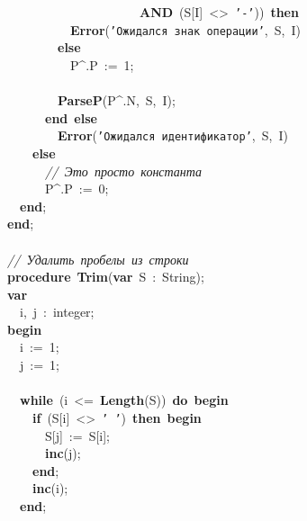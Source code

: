 \mbox{}\ \ \ \ \ \ \ \ \ \ \ \ \ \ \ \ \ \ \ \ \ \textbf{AND}\ (S[I]\ \textless{}\textgreater{}\ \texttt{'-'}))\ \textbf{then} \\
\mbox{}\ \ \ \ \ \ \ \ \ \ \textbf{Error}(\texttt{'Ожидался\ знак\ операции'},\ S,\ I) \\
\mbox{}\ \ \ \ \ \ \ \ \textbf{else} \\
\mbox{}\ \ \ \ \ \ \ \ \ \ P\textasciicircum{}.P\ :=\ 1; \\
\mbox{} \\
\mbox{}\ \ \ \ \ \ \ \ \textbf{ParseP}(P\textasciicircum{}.N,\ S,\ I); \\
\mbox{}\ \ \ \ \ \ \textbf{end}\ \textbf{else} \\
\mbox{}\ \ \ \ \ \ \ \ \textbf{Error}(\texttt{'Ожидался\ идентификатор'},\ S,\ I) \\
\mbox{}\ \ \ \ \textbf{else} \\
\mbox{}\ \ \ \ \ \ \textit{//\ Это\ просто\ константа} \\
\mbox{}\ \ \ \ \ \ P\textasciicircum{}.P\ :=\ 0; \\
\mbox{}\ \ \textbf{end}; \\
\mbox{}\textbf{end}; \\
\mbox{} \\
\mbox{}\textit{//\ Удалить\ пробелы\ из\ строки} \\
\mbox{}\textbf{procedure}\ \textbf{Trim}(\textbf{var}\ S\ :\ String); \\
\mbox{}\textbf{var} \\
\mbox{}\ \ i,\ j\ :\ integer; \\
\mbox{}\textbf{begin} \\
\mbox{}\ \ i\ :=\ 1; \\
\mbox{}\ \ j\ :=\ 1; \\
\mbox{} \\
\mbox{}\ \ \textbf{while}\ (i\ \textless{}=\ \textbf{Length}(S))\ \textbf{do}\ \textbf{begin} \\
\mbox{}\ \ \ \ \textbf{if}\ (S[i]\ \textless{}\textgreater{}\ \texttt{'\ '})\ \textbf{then}\ \textbf{begin} \\
\mbox{}\ \ \ \ \ \ S[j]\ :=\ S[i]; \\
\mbox{}\ \ \ \ \ \ \textbf{inc}(j); \\
\mbox{}\ \ \ \ \textbf{end}; \\
\mbox{}\ \ \ \ \textbf{inc}(i); \\
\mbox{}\ \ \textbf{end}; \\
\mbox{} \\
